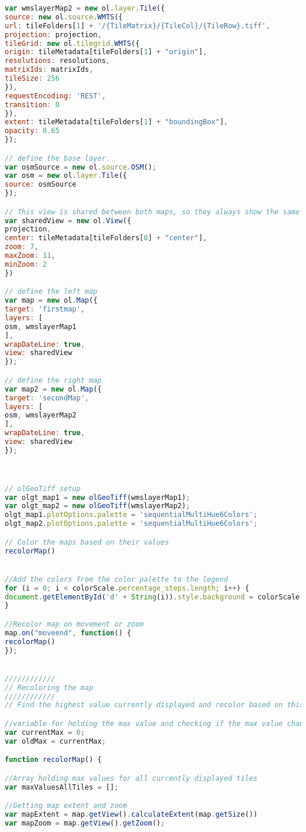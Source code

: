 \begin{lstlisting}[language=JavaScript, caption={The JavaScript for the map}, label= VoresJS,escapechar=|]
var wmslayerMap2 = new ol.layer.Tile({
source: new ol.source.WMTS({
url: tileFolders[1] + '/{TileMatrix}/{TileCol}/{TileRow}.tiff',
projection: projection,
tileGrid: new ol.tilegrid.WMTS({
origin: tileMetadata[tileFolders[1] + "origin"],
resolutions: resolutions,
matrixIds: matrixIds,
tileSize: 256
}),
requestEncoding: 'REST',
transition: 0
}),
extent: tileMetadata[tileFolders[1] + "boundingBox"],
opacity: 0.65
});

// define the base layer
var osmSource = new ol.source.OSM();
var osm = new ol.layer.Tile({
source: osmSource
});

// This view is shared between both maps, so they always show the same
var sharedView = new ol.View({
projection,
center: tileMetadata[tileFolders[0] + "center"],
zoom: 7,
maxZoom: 11,
minZoom: 2
})

// define the left map
var map = new ol.Map({
target: 'firstmap',
layers: [
osm, wmslayerMap1
],
wrapDateLine: true,
view: sharedView
});

// define the right map
var map2 = new ol.Map({
target: 'secondMap',
layers: [
osm, wmslayerMap2
],
wrapDateLine: true,
view: sharedView
});



// olGeoTiff setup
var olgt_map1 = new olGeoTiff(wmslayerMap1);
var olgt_map2 = new olGeoTiff(wmslayerMap2);
olgt_map1.plotOptions.palette = 'sequentialMultiHue6Colors';
olgt_map2.plotOptions.palette = 'sequentialMultiHue6Colors';

// Color the maps based on their values
recolorMap()


//Add the colors from the color palette to the legend
for (i = 0; i < colorScale.percentage_steps.length; i++) {
document.getElementById('d' + String(i)).style.background = colorScale.color_steps[i]
}

//Recolor map on movement or zoom
map.on("moveend", function() {
recolorMap()
});


////////////
// Recoloring the map
////////////
// Find the highest value currently displayed and recolor based on this

//variable for holding the max value and checking if the max value changes
var currentMax = 0;
var oldMax = currentMax;

function recolorMap() {

//Array holding max values for all currently displayed tiles
var maxValuesAllTiles = [];

//Getting map extent and zoom
var mapExtent = map.getView().calculateExtent(map.getSize())
var mapZoom = map.getView().getZoom();


\end{lstlisting}
